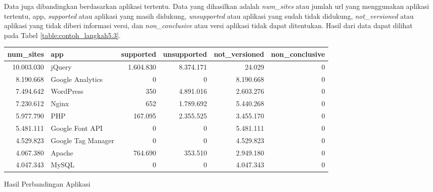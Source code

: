 
Data juga dibandingkan berdasarkan aplikasi tertentu. Data yang dihasilkan adalah \textit{num\_sites} atau jumlah url yang menggunakan aplikasi tertentu, app, \textit{supported} atau aplikasi yang masih didukung, \textit{unsupported} atau aplikasi yang sudah tidak didukung, \textit{not\_versioned} atau aplikasi yang tidak diberi informasi versi, dan \textit{non\_conclusive} atau versi aplikasi tidak dapat ditentukan. Hasil dari data dapat dilihat pada Tabel \ref{table:contoh_langkah5.3}.
\begin{adjustwidth}{-2.5 cm}{-2.5 cm}\centering\begin{threeparttable}[!htb]
	\begin{tabular}{|r|l|r|r|r|r|}
		\hline
		\textbf{num\_sites} & \textbf{app} & \textbf{supported} & \textbf{unsupported} & \textbf{not\_versioned} & \textbf{non\_conclusive}\\
		\hline
		10.003.030 &jQuery &1.604.830 &8.374.171 &24.029 &0 \\
		\hline
		8.190.668 &Google Analytics &0 &0 &8.190.668 &0 \\
		\hline
		7.494.642 &WordPress &350 &4.891.016 &2.603.276 &0 \\
		\hline
		7.230.612 &Nginx &652 &1.789.692 &5.440.268 &0 \\
		\hline
		5.977.790 &PHP &167.095 &2.355.525 &3.455.170 &0 \\
		\hline
		5.481.111 &Google Font API &0 &0 &5.481.111 &0 \\
		\hline
		4.529.823 &Google Tag Manager &0 &0 &4.529.823 &0 \\
		\hline
		4.067.380 &Apache &764.690 &353.510 &2.949.180 &0 \\
		\hline
		4.047.343 &MySQL &0 &0 &4.047.343 &0 \\
		\hline
	\end{tabular}
	\caption{Hasil Perbandingan Aplikasi}
	\label{table:contoh_langkah5.3}
\end{threeparttable}\end{adjustwidth}


